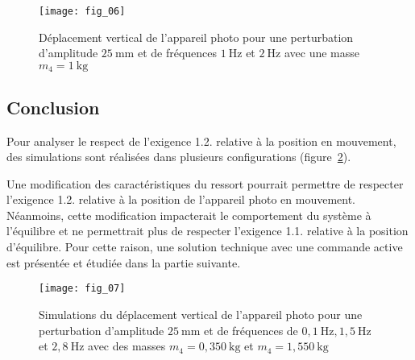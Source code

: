 \begin{figure}[H]
\centering
\texttt{[image: fig\_06]}
\caption{\label{fig:06} Déplacement vertical de l'appareil photo pour une perturbation d'amplitude $25 \mathrm{~mm}$ et de fréquences $1 \mathrm{~Hz}$ et $2 \mathrm{~Hz}$ avec une masse $m_{4}=1 \mathrm{~kg}$}
\end{figure}



\ifprof
\begin{corrige}
\end{corrige}
\else
\fi

\subsection{Conclusion}
Pour analyser le respect de l'exigence 1.2. relative à la position en mouvement, des simulations sont réalisées dans plusieurs configurations (figure~\ref{fig:07}).

\ifprof
\begin{corrige}
\end{corrige}
\else
\fi

Une modification des caractéristiques du ressort pourrait permettre de respecter l'exigence 1.2. relative à la position de l'appareil photo en mouvement. Néanmoins, cette modification impacterait le comportement du système à l'équilibre et ne permettrait plus de respecter l'exigence 1.1. relative à la position d'équilibre. Pour cette raison, une solution technique avec une commande active est présentée et étudiée dans la partie suivante.


\begin{figure}[H]
\centering
\texttt{[image: fig\_07]}
\caption{\label{fig:07} Simulations du déplacement vertical de l'appareil photo pour une perturbation d'amplitude $25 \mathrm{~mm}$ et de fréquences de $0,1 \mathrm{~Hz}, 1,5 \mathrm{~Hz}$ et $2,8 \mathrm{~Hz}$ avec des masses $m_{4}=0,350 \mathrm{~kg}$ et $m_{4}=1,550 \mathrm{~kg}$
}
\end{figure}



